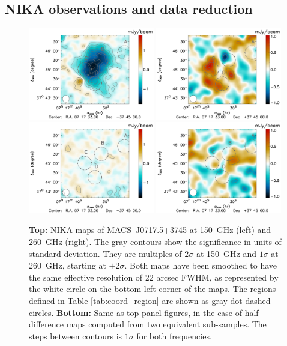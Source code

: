 \documentclass[twocolumn,traditabstract]{aa}
\begin{document}
\subsection{NIKA observations and data reduction}\label{sec:NIKA_observations_and_data_reduction}
\begin{figure}[h]
\centering
\includegraphics[width=0.49\textwidth]{Figure/MACSJ0717_2mm_map.pdf}
\includegraphics[width=0.49\textwidth]{Figure/MACSJ0717_1mm_map.pdf}
\includegraphics[width=0.49\textwidth]{Figure/MACSJ0717_JK_2mm_map.pdf}
\includegraphics[width=0.49\textwidth]{Figure/MACSJ0717_JK_1mm_map.pdf}
\caption{\footnotesize{{\bf Top:} NIKA maps of \mbox{MACS~J0717.5+3745} at 150~GHz (left) and 260~GHz (right). The gray contours show the significance in units of standard deviation. They are multiples of $2 \sigma$ at 150~GHz and $1 \sigma$ at 260~GHz, starting at $\pm 2 \sigma$. Both maps have been smoothed to have the same effective resolution of 22 arcsec FWHM, as represented by the white circle on the bottom left corner of the maps. The regions defined in Table \ref{tab:coord_region} are shown as gray dot-dashed circles. {\bf Bottom:} Same as top-panel figures, in the case of half difference maps computed from two equivalent sub-samples. The steps between contours is $1 \sigma$ for both frequencies.}}
\label{fig:NIKA_raw_maps}
\end{figure}
\end{document}
